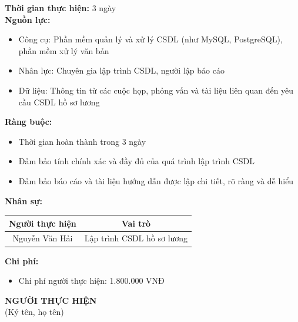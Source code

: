 {\begin{minipage}{\textwidth}
\begin{itemize}
    \end{itemize}
    \vspace{0.5cm}
    \noindent \textbf{Thời gian thực hiện:} 3 ngày \\
    \noindent \textbf{Nguồn lực:}
    \begin{itemize}
        \item Công cụ: Phần mềm quản lý và xử lý CSDL (như MySQL, PostgreSQL), phần mềm xử lý văn bản
        \item Nhân lực: Chuyên gia lập trình CSDL, người lập báo cáo
        \item Dữ liệu: Thông tin từ các cuộc họp, phỏng vấn và tài liệu liên quan đến yêu cầu CSDL hồ sơ lương
    \end{itemize}
    \vspace{0.5cm}
    \noindent \textbf{Ràng buộc:}
    \begin{itemize}
        \item Thời gian hoàn thành trong 3 ngày
        \item Đảm bảo tính chính xác và đầy đủ của quá trình lập trình CSDL
        \item Đảm bảo báo cáo và tài liệu hướng dẫn được lập chi tiết, rõ ràng và dễ hiểu
    \end{itemize}
    \vspace{0.5cm}
    \noindent \textbf{Nhân sự:}
    \begin{longtable}{|c|c|}
    \hline
    \textbf{Người thực hiện} & \textbf{Vai trò} \\
    \hline
    Nguyễn Văn Hải & Lập trình CSDL hồ sơ lương \\
    \hline
    \end{longtable}
    \vspace{0.5cm}
    \noindent \textbf{Chi phí:}
    \begin{itemize}
        \item Chi phí người thực hiện: 1.800.000 VNĐ
    \end{itemize}
    \vspace{1cm}
    \begin{flushleft}
        \hspace{8cm} \textbf{NGƯỜI THỰC HIỆN} \\
        \hspace{8.8cm} (Ký tên, họ tên) \\
        \vspace{1cm}
    \end{flushleft}
    \end{minipage}
}
% 
